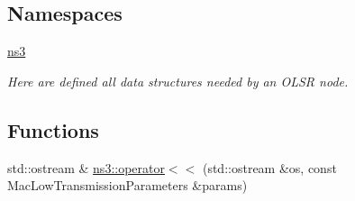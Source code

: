 \subsection*{Namespaces}
\begin{DoxyCompactItemize}
\item 
 \hyperlink{namespacens3}{ns3}
\begin{DoxyCompactList}\small\item\em Here are defined all data structures needed by an O\+L\+SR node. \end{DoxyCompactList}\end{DoxyCompactItemize}
\subsection*{Functions}
\begin{DoxyCompactItemize}
\item 
std\+::ostream \& \hyperlink{namespacens3_a17416fd3f724a641f85376500de5944a}{ns3\+::operator$<$$<$} (std\+::ostream \&os, const Mac\+Low\+Transmission\+Parameters \&params)
\end{DoxyCompactItemize}
